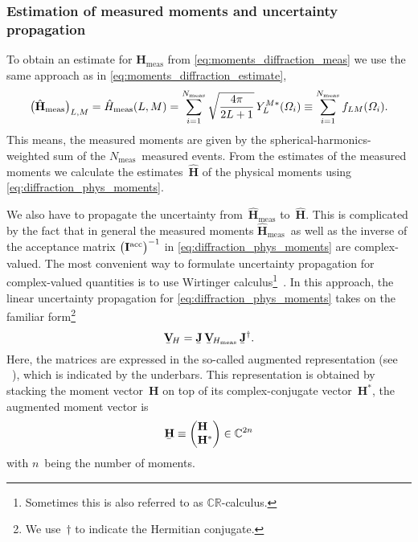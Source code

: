 \subsubsection{Estimation of measured moments and uncertainty propagation}%
\label{sec:diffraction:estimation_uncert}

To obtain an estimate for $\mathbf{H}_\text{meas}$ from
\cref{eq:moments_diffraction_meas} we use the same approach as in
\cref{eq:moments_diffraction_estimate}, \ie
\begin{equation}
  \label{eq:moments_meas_diffraction_estimate}
  \rBrk[1]{\hat{\mathbf{H}}_\text{meas}}_{L, M}
  = \hat{H}_\text{meas}(L, M)
  = \sum_{i = 1}^{N_\text{meas}} \sqrt{\frac{4 \pi}{2 L + 1}}\, Y_L^{M *}(\Omega_i)
  \equiv \sum_{i = 1}^{N_\text{meas}} f_{L M}(\Omega_i).
\end{equation}
This means, the measured moments are given by the
spherical-harmonics-weighted sum of the $N_\text{meas}$~measured
events.  From the estimates of the measured moments we calculate the
estimates~$\hat{\mathbf{H}}$ of the physical moments using
\cref{eq:diffraction_phys_moments}.

We also have to propagate the uncertainty
from~$\hat{\mathbf{H}}_\text{meas}$ to~$\hat{\mathbf{H}}$.  This is
complicated by the fact that in general the measured moments
$\hat{\mathbf{H}}_\text{meas}$~as well as the inverse of the
acceptance matrix $\rBrk[1]{\mathbf{I}^\text{acc}}^{-1}$ in
\cref{eq:diffraction_phys_moments} are complex-valued.  The most
convenient way to formulate uncertainty propagation for complex-valued
quantities is to use Wirtinger calculus\footnote{Sometimes this is
also referred to as
$\mathbb{C}\mathbb{R}$-calculus.}~\cite{wikipedia:WirtingerCalculus,Wirtinger:1927,Kreutz-Delgado:2009,Grube:2023}.
In this approach, the linear uncertainty propagation for
\cref{eq:diffraction_phys_moments} takes on the familiar
form\footnote{We use~$\dagger$ to indicate the Hermitian conjugate.}
\begin{equation}
  \label{eq:complex_uncert_prop}
  \underaccent{\bar}{\covMatSym}_{\!H}
  = \underaccent{\bar}{\mathbf{J}}\, \underaccent{\bar}{\covMatSym}_{\!H_\text{meas}}\, \underaccent{\bar}{\mathbf{J}}^\dagger.
\end{equation}
Here, the matrices are expressed in the so-called augmented
representation (see \eg\ ), which is
indicated by the underbars.  This representation is obtained by
stacking the moment vector~$\mathbf{H}$ on top of its
complex-conjugate vector~$\mathbf{H}^*$, \ie the augmented moment
vector is
\begin{equation}
  \underaccent{\bar}{\mathbf{H}}
  \equiv \begin{pmatrix*}[l]
    \mathbf{H} \\
    \mathbf{H}^*
  \end{pmatrix*}
  \in \mathbb{C}^{2n}
\end{equation}
with $n$~being the number of moments.

